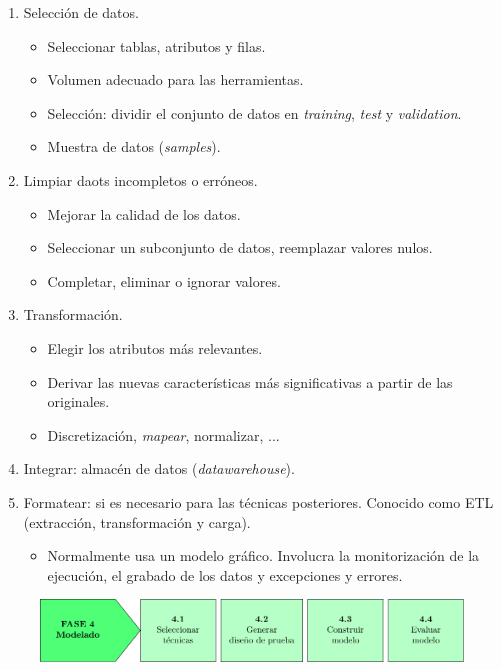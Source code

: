 \begin{enumerate}[label=3.\arabic*]
\item Selección de datos.
\begin{itemize}
\item Seleccionar tablas, atributos y filas.
\item Volumen adecuado para las herramientas.
\item Selección: dividir el conjunto de datos en \textit{training}, \textit{test} y \textit{validation}.
\item Muestra de datos (\textit{samples}).
\end{itemize}
\item Limpiar daots incompletos o erróneos.
\begin{itemize}
\item Mejorar la calidad de los datos.
\item Seleccionar un subconjunto de datos, reemplazar valores nulos.
\item Completar, eliminar o ignorar valores.
\end{itemize}
\item Transformación.
\begin{itemize}
\item Elegir los atributos más relevantes.
\item Derivar las nuevas características más significativas a partir de las originales.
\item Discretización, \textit{mapear}, normalizar, ...
\end{itemize}
\item Integrar: almacén de datos (\textit{datawarehouse}).
\item Formatear: si es necesario para las técnicas posteriores. Conocido como ETL (extracción, transformación y carga).
\begin{itemize}
\item Normalmente usa un modelo gráfico. Involucra la monitorización de la ejecución, el grabado de los datos y excepciones y errores.
\end{itemize}
\end{enumerate}

\begin{figure}[H]
\centering
\includegraphics[width=\textwidth]{fotos/16.pdf}
\end{figure}

